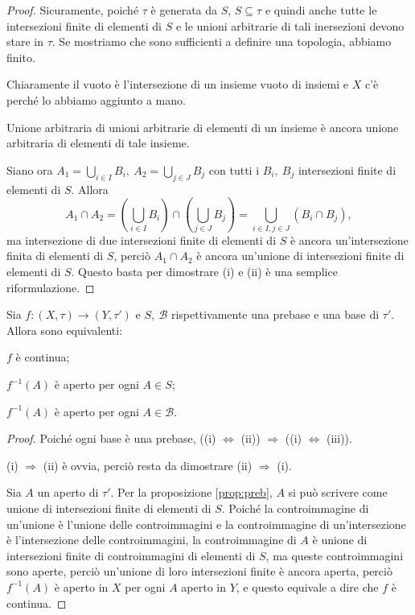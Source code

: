 \documentclass{article}
\begin{document}
\begin{proof}
	Sicuramente, poiché $\tau$ è generata da $S$, $S \subseteq \tau$ e quindi
	anche tutte le intersezioni finite di elementi di $S$ e le unioni arbitrarie
	di tali inersezioni devono stare in $\tau$. Se mostriamo che sono
	sufficienti a definire una topologia, abbiamo finito.

    Chiaramente il vuoto è l'intersezione di un insieme vuoto di insiemi e $X$
    c'è perché lo abbiamo aggiunto a mano.

    Unione arbitraria di unioni arbitrarie di elementi di un insieme è ancora
    unione arbitraria di elementi di tale insieme.

    Siano ora $\displaystyle A_1= \bigcup_{i \in I} B_i,\ A_2=\bigcup_{j \in J}
    B_j$ con tutti
    i $B_i,\ B_j$ intersezioni finite di elementi di $S$. Allora
    $$A_1 \cap A_2 =
    \left( \bigcup_{i \in I} B_i \right) \cap \left(\bigcup_{j \in J} B_j
    \right)= \bigcup_{i \in I, j \in J} (B_i \cap B_j),$$
     ma  intersezione di due intersezioni finite di elementi di $S$ è ancora
     un'intersezione finita di elementi di $S$, perciò $A_1 \cap A_2$ è ancora
     un'unione di intersezioni finite di elementi di $S$. Questo basta per
     dimostrare (i) e (ii) è una semplice riformulazione.
\end{proof}

\begin{prop}
	Sia $f: (X, \tau) \rightarrow (Y, \tau')$ e $S,\ \mathcal{B}$
	rispettivamente una prebase e una base di $\tau'$. Allora sono equivalenti:
	\begin{nlist}
		\item $f$ è continua;
		\item $f^{-1}(A)$ è aperto per ogni $A \in S$;
		\item $f^{-1}(A)$ è aperto per ogni $A \in \mathcal{B}$.
	\end{nlist}
\end{prop}

\begin{proof}
	Poiché ogni base è una prebase, ((i) $\Leftrightarrow$ (ii)) $\Rightarrow$
	((i) $\Leftrightarrow$ (iii)).

	(i) $\Rightarrow$ (ii) è ovvia, perciò resta da dimostrare (ii)
	$\Rightarrow$ (i).

	Sia $A$ un aperto di $\tau'$. Per la proposizione \ref{prop:preb}, $A$ si
	può scrivere come unione di intersezioni finite di elementi di $S$. Poiché
	la controimmagine di un'unione è l'unione delle controimmagini e la
	controimmagine di un'intersezione è l'intersezione delle controimmagini, la
	controimmagine di $A$ è unione di intersezioni finite di controimmagini di
	elementi di $S$, ma queste controimmagini sono aperte, perciò un'unione di
	loro intersezioni finite è ancora aperta, perciò $f^{-1}(A)$ è aperto in $X$
	per ogni $A$ aperto in $Y$, e questo equivale a dire che $f$ è continua.
\end{proof}
\end{document}
